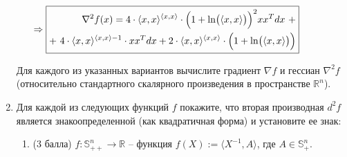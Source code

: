 \documentclass[a5paper,twoside,russian]{article}
\def  \R {\mathbb R}
\newcommand{\St}{\mathbb{S}}
\def\la{\langle}
\def\ra{\rangle}
\begin{document}
\begin{enumerate}[label=\textbf{Задача \arabic*.}]
\begin{enumerate}
\begin{prf}
            \begin{center}
                $\Rightarrow \boxed{
                \begin{aligned}
                    \nabla^2 f(x) = 4 \cdot \la x, x \ra^{\la x, x \ra} \cdot \Bigl( 1 + \ln \bigl( \la x, x \ra \bigr) \Bigr)^2 x x^T dx \text{ } + \\ 
                    + \text{ } 4 \cdot \la x, x \ra^{\la x, x \ra - 1} \cdot x x^T dx + 
                    2 \cdot \la x, x \ra^{\la x, x \ra} \cdot \Bigl( 1 + \ln \bigl( \la x, x \ra \bigr) \Bigr)
                \end{aligned}}$
            \end{center}
        \end{prf}

    \end{enumerate}
    Для каждого из указанных вариантов вычислите градиент $\nabla f$ и гессиан $\nabla^2 f$ (относительно стандартного скалярного произведения в пространстве $\R^n$).

    \item Для каждой из следующих функций $f$ покажите, что вторая производная $d^2 f$ является знакоопределенной (как квадратичная форма) и установите ее знак:
    \begin{enumerate}
        \item (3 балла) $f : \St^n_{++} \to \R$ -- функция $f(X) := \la X^{-1}, A \ra$, где $A \in \St^n_+$.
    \end{enumerate}
        
\end{enumerate}
\end{document}
